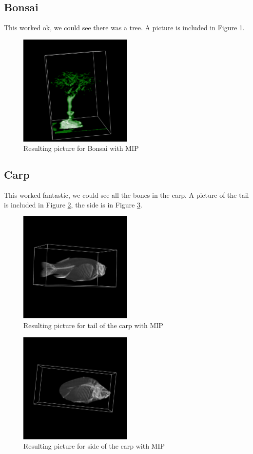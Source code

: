 \documentclass[a4paper,twoside,11pt]{article}
\begin{document}
\subsection{Bonsai}
This worked ok, we could see there was a tree. A picture is included in Figure \ref{MBon}.
\begin{figure}[!h]
  \centering
  \includegraphics[width=0.5\textwidth]{MBon.png}
  \caption{Resulting picture for Bonsai with MIP}
  \label{MBon}
\end{figure}
\subsection{Carp}
This worked fantastic, we could see all the bones in the carp. A picture of the tail is included in Figure \ref{MCT}, the side is in Figure \ref{MCS}.
\begin{figure}[!h]
  \centering
  \includegraphics[width=0.5\textwidth]{MCT.png}
  \caption{Resulting picture for tail of the carp with MIP}
  \label{MCT}
\end{figure}
\begin{figure}[!h]
  \centering
  \includegraphics[width=0.5\textwidth]{MCS.png}
  \caption{Resulting picture for side of the carp with MIP}
  \label{MCS}
\end{figure}
\end{document}
